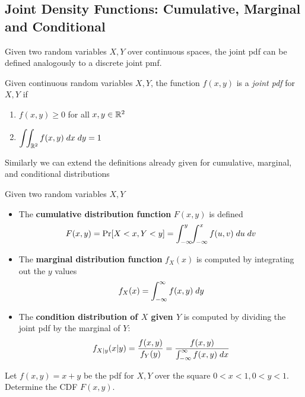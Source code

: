 \documentclass[../main.tex]{subfiles}
\begin{document}
\subsection{Joint Density Functions: Cumulative, Marginal and Conditional}
Given two random variables $X,Y$ over continuous spaces, the joint pdf can be defined
analogously to a discrete joint pmf.
\begin{definition}
Given continuous random variables $X,Y$, the function $f(x,y)$ is a \textit{joint pdf} for $X,Y$
if 
\begin{enumerate}
    \item $f(x,y) \geq 0$ for all $x,y \in \mathbb{R}^2$
    \item $\displaystyle\int\!\!\int_{\mathbb{R}^2} f(x,y) \;dx \;dy  = 1$
\end{enumerate}
\end{definition}
\noindent
Similarly we can extend the definitions already given for cumulative, marginal, and conditional distributions
\begin{definition}
    Given two random variables $X,Y$
    \begin{itemize}
        \item The \textbf{cumulative distribution function} $F(x,y)$ is defined
        $$F(x,y) = \mathrm{Pr}[X<x,Y<y] = \int_{-\infty}^y \!\! \int_{-\infty}^x f(u,v) \;du \;dv$$
        \item The \textbf{marginal distribution function} $f_X(x)$ is computed
        by integrating out the $y$ values
        $$ f_X(x) = \int_{-\infty}^{\infty} f(x,y) \;dy $$
        \item The \textbf{condition distribution of $X$ given $Y$} is computed by dividing the 
        joint pdf by the marginal of $Y$:
        $$f_{X|y}(x|y) = \dfrac{f(x,y)}{f_Y(y)} = \dfrac{f(x,y)}{\int_{-\infty}^{\infty} f(x,y) \;dx }$$
    \end{itemize}
\end{definition}
\begin{example}
Let $f(x,y) = x+y$ be the pdf for $X,Y$ over the square $0<x<1, 0<y<1$. Determine the 
CDF $F(x,y)$.
\end{example}
\end{document}
